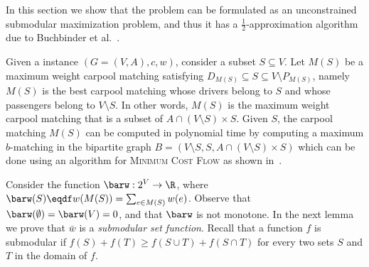 In this section we show that the \carpool problem can be formulated as
an unconstrained submodular maximization problem, and thus it has a
$\frac{1}{2}$-approximation algorithm due to Buchbinder et
al.~\cite{BFNS15,buchbinder2016deterministic}.

Given a \carpool instance $(G = (V,A), c, w)$, consider a subset
$S \subseteq V$.  Let $M(S)$ be a maximum weight carpool matching
satisfying $D_{M(S)} \subseteq S \subseteq V \setminus P_{M(S)}$,
namely $M(S)$ is the best carpool matching whose drivers belong to $S$
and whose passengers belong to $V \setminus S$.  In other words,
$M(S)$ is the maximum weight carpool matching that is a subset of
$A \cap (V \setminus S) \times S$.
%
Given $S$, the carpool matching $M(S)$ can be computed in polynomial
time by computing a maximum $b$-matching in the bipartite graph $B =
(V \setminus S, S, A \cap (V \setminus S) \times S)$ which can be done
using an algorithm for \textsc{Minimum Cost Flow} as shown
in~\cite{kutiel2017}.

Consider the function $\barw: 2^V \to \R$, where $\barw(S) \eqdf
w(M(S)) = \sum_{e \in M(S)} w(e)$.  Observe that $\barw(\emptyset)
= \barw(V) = 0$, and that $\barw$ is not monotone.
%
In the next lemma we prove that $\bar{w}$ is a \emph{submodular set
function}.  Recall that a function $f$ is submodular if $f(S) +
f(T) \geq f(S \cup T) + f(S \cap T)$ for every two sets $S$ and $T$ in
the domain of $f$.

